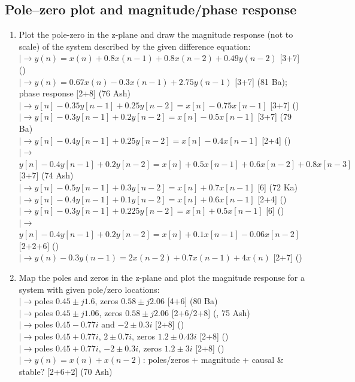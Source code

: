 \documentclass[12pt]{article}
\newcommand{\lb}{\\$\left|\rightarrow\right.$}
\begin{document}
  \subsection{Pole--zero plot and magnitude/phase response}
    \begin{enumerate}[topsep=0pt, noitemsep]
      \item Plot the pole-zero in the z-plane and draw the magnitude response (not to scale) of the system described by the given difference equation:
        \lb $y(n)=x(n)+0.8x(n-1)+0.8x(n-2)+0.49y(n-2)$ \hfill [3+7] ()
        \lb $y(n)=0.67x(n)-0.3x(n-1)+2.75y(n-1)$ \hfill [3+7] (81 Ba); phase response \hfill [2+8] (76 Ash)
        \lb $y[n]-0.35y[n-1]+0.25y[n-2]=x[n]-0.75x[n-1]$ \hfill [3+7] ()
        \lb $y[n]-0.3y[n-1]+0.2y[n-2]=x[n]-0.5x[n-1]$ \hfill [3+7] (79 Ba)
        \lb $y[n]-0.4y[n-1]+0.25y[n-2]=x[n]-0.4x[n-1]$ \hfill [2+4] ()
        \lb $y[n]-0.4y[n-1]+0.2y[n-2]=x[n]+0.5x[n-1]+0.6x[n-2]+0.8x[n-3]$ \hfill [3+7] (74 Ash)
        \lb $y[n]-0.5y[n-1]+0.3y[n-2]=x[n]+0.7x[n-1]$ \hfill [6] (72 Ka)
        \lb $y[n]-0.4y[n-1]+0.1y[n-2]=x[n]+0.6x[n-1]$ \hfill [2+4] ()
        \lb $y[n]-0.3y[n-1]+0.225y[n-2]=x[n]+0.5x[n-1]$ \hfill [6] ()
        \lb $y[n]-0.4y[n-1]+0.2y[n-2]=x[n]+0.1x[n-1]-0.06x[n-2]$ \hfill [2+2+6] ()
        \lb $y(n)-0.3y(n-1)=2x(n-2)+0.7x(n-1)+4x(n)$ \hfill [2+7] ()

      \item Map the poles and zeros in the z-plane and plot the magnitude response for a system with given pole/zero locations:
        \lb poles $0.45\pm j1.6$, zeros $0.58\pm j2.06$ \hfill [4+6] (80 Ba)
        \lb poles $0.45\pm j1.06$, zeros $0.58\pm j2.06$ \hfill [2+6/2+8] (, 75 Ash)
        \lb poles $0.45-0.77i$ and $-2\pm0.3i$ \hfill [2+8] ()
        \lb poles $0.45+0.77i$, $2\pm0.7i$, zeros $1.2\pm0.43i$ \hfill [2+8] ()
        \lb poles $0.45+0.77i$, $-2\pm0.3i$, zeros $1.2\pm3i$ \hfill [2+8] ()
        \lb $y(n)=x(n)+x(n-2)$: poles/zeros + magnitude + causal \& stable? \hfill [2+6+2] (70 Ash)
    \end{enumerate}
\end{document}
